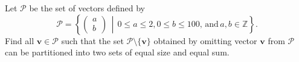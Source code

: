 Let $\mathcal{P}$ be the set of vectors defined by
\[\mathcal{P} = \left\{\begin{pmatrix} a \\ b \end{pmatrix} \, \middle\vert \, 0 \le a \le 2, 0 \le b \le 100, \, \text{and} \, a, b \in \mathbb{Z}\right\}.\]Find all $\mathbf{v} \in \mathcal{P}$ such that the set $\mathcal{P}\setminus\{\mathbf{v}\}$ obtained by omitting vector $\mathbf{v}$ from $\mathcal{P}$ can be partitioned into two sets of equal size and equal sum.